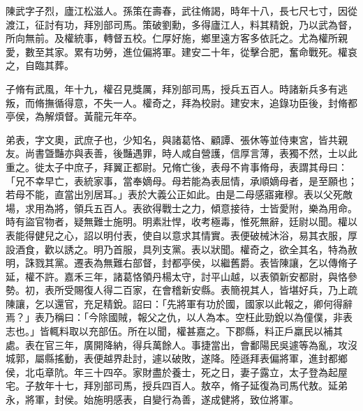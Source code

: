 \begin{pinyinscope}
 
 
 陳武字子烈，廬江松滋人。孫策在壽春，武往脩謁，時年十八，長七尺七寸，因從渡江，征討有功，拜別部司馬。策破劉勳，多得廬江人，料其精銳，乃以武為督，所向無前。及權統事，轉督五校。仁厚好施，鄉里遠方客多依託之。尤為權所親愛，數至其家。累有功勞，進位偏將軍。建安二十年，從擊合肥，奮命戰死。權哀之，自臨其葬。
 
 
 
 
 
 
 子脩有武風，年十九，權召見獎厲，拜別部司馬，授兵五百人。時諸新兵多有逃叛，而脩撫循得意，不失一人。權奇之，拜為校尉。建安末，追錄功臣後，封脩都亭侯，為解煩督。黃龍元年卒。
 
 
 
 
 弟表，字文奧，武庶子也，少知名，與諸葛恪、顧譚、張休等並侍東宮，皆共親友。尚書曁豔亦與表善，後豔遇罪，時人咸自營護，信厚言薄，表獨不然，士以此重之。徙太子中庶子，拜翼正都尉。兄脩亡後，表母不肯事脩母，表謂其母曰：「兄不幸早亡，表統家事，當奉嫡母。母若能為表屈情，承順嫡母者，是至願也；若母不能，直當出別居耳。」表於大義公正如此。由是二母感寤雍穆。表以父死敵場，求用為將，領兵五百人。表欲得戰士之力，傾意接待，士皆愛附，樂為用命。時有盜官物者，疑無難士施明。明素壯悍，收考極毒，惟死無辭，廷尉以聞。權以表能得健兒之心，詔以明付表，使自以意求其情實。表便破械沐浴，易其衣服，厚設酒食，歡以誘之。明乃首服，具列支黨。表以狀聞。權奇之，欲全其名，特為赦明，誅戮其黨。遷表為無難右部督，封都亭侯，以繼舊爵。表皆陳讓，乞以傳脩子延，權不許。嘉禾三年，諸葛恪領丹楊太守，討平山越，以表領新安都尉，與恪參勢。初，表所受賜復人得二百家，在會稽新安縣。表簡視其人，皆堪好兵，乃上疏陳讓，乞以還官，充足精銳。詔曰：「先將軍有功於國，國家以此報之，卿何得辭焉？」表乃稱曰：「今除國賊，報父之仇，以人為本。空枉此勁銳以為僮僕，非表志也。」皆輒料取以充部伍。所在以聞，權甚嘉之。下郡縣，料正戶羸民以補其處。表在官三年，廣開降納，得兵萬餘人。事捷當出，會鄱陽民吳遽等為亂，攻沒城郭，屬縣搖動，表便越界赴討，遽以破敗，遂降。陸遜拜表偏將軍，進封都鄉侯，北屯章阬。年三十四卒。家財盡於養士，死之日，妻子露立，太子登為起屋宅。子敖年十七，拜別部司馬，授兵四百人。敖卒，脩子延復為司馬代敖。延弟永，將軍，封侯。始施明感表，自變行為善，遂成健將，致位將軍。
 
 
\end{pinyinscope}
